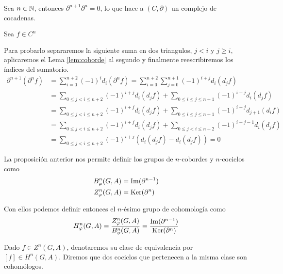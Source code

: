 \begin{teorema}\label{prop:cochaincomplex}
	Sea $n\in \mathbb{N}$, entonces $\partial^{n+1}\partial^n = 0$, lo que hace a
	$(C,\partial)$ un complejo de cocadenas.
	\begin{demostracion}
		Sea $f\in C^n$ %
		
		Para probarlo separaremos la siguiente suma en dos triangulos,  $j<i$ y $j\geq i$, aplicaremos el Lema \ref{lem:coborde} al segundo y finalmente reescribiremos los índices del sumatorio.
		\begin{align*}
		\partial^{n+1}(\partial^{n} f) 
			&= \sum_{i=0}^{n+2} (-1)^i d_i(\partial^n f) = \sum_{i=0}^{n+2}\sum_{j=0}^{n+1} (-1)^{i+j} d_i(d_jf)\\
			&= \sum_{0\leq j < i \leq n+2} (-1)^{i+j} d_i(d_jf)  + \sum_{0\leq i \leq j \leq n+1} (-1)^{i+j} d_i(d_jf)\\
			&= \sum_{0\leq j < i \leq n+2} (-1)^{i+j} d_i(d_jf)  + \sum_{0\leq i \leq j \leq n+1} (-1)^{i+j} d_{j+1}(d_if) \\
			&= \sum_{0\leq j < i \leq n+2} (-1)^{i+j} d_i(d_jf)  + \sum_{0\leq j < i \leq n+2} (-1)^{i+j-1} d_{i}(d_jf) \\
			&= \sum_{0\leq j < i \leq n+2} (-1)^{i+j}(d_i(d_jf)-d_i(d_jf)) = 0
		\end{align*}
	\end{demostracion}
\end{teorema}

\begin{definicion}
	La proposición anterior nos permite definir los grupos de $n$-cobordes y $n$-cociclos como 
	\begin{align*}
		B^n_\varphi(G,A) &= \operatorname{Im}(\partial^{n-1}) \\
		Z^n_\varphi(G,A) &= \operatorname{Ker}(\partial^{n})
	\end{align*}
	
	Con ellos podemos definir entonces el $n$-ésimo grupo de cohomología como 
	\begin{equation}
		H^n_\varphi(G,A) = \frac{Z^n_\varphi(G,A)}{B^n_\varphi(G,A)} = \frac{\operatorname{Im}(\partial^{n-1})}{\operatorname{Ker}(\partial^{n})}
	\end{equation}
	
	Dado $f\in Z^n(G,A)$, denotaremos su clase de equivalencia por $[f]\in H^n(G,A)$. Diremos que dos cociclos que pertenecen a la misma clase son cohomólogos. 
\end{definicion}

